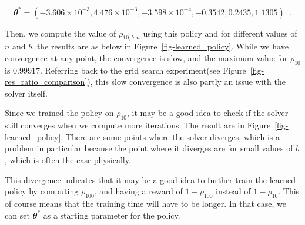 \documentclass[
  letterpaper,
]{report}
\theoremstyle{plain}
\theoremstyle{definition}
\theoremstyle{definition}
\theoremstyle{remark}
\begin{document}
\[
\mathbfit{\theta}^* = (-3.606 \times 10^{-3},4.476\times 10^{-3},-3.598\times 10^{-4},-0.3542 ,0.2435,1.1305)^\intercal.
\]

Then, we compute the value of \(\rho_{10,b,n}\) using this policy and
for different values of \(n\) and \(b\), the results are as below in
Figure~\ref{fig-learned_policy}. While we have convergence at any point,
the convergence is slow, and the maximum value for \(\rho_{10}\) is
\(0.99917\). Referring back to the grid search experiment(see
Figure~\ref{fig-res_ratio_comparison}), this slow convergence is also
partly an issue with the solver itself.

Since we trained the policy on \(\rho_{10}\), it may be a good idea to
check if the solver still converges when we compute more iterations. The
result are in Figure~\ref{fig-learned_policy}. There are some points
where the solver diverges, which is a problem in particular because the
point where it diverges are for small values of \(b\), which is often
the case physically.

This divergence indicates that it may be a good idea to further train
the learned policy by computing \(\rho_{100}\), and having a reward of
\(1-\rho_{100}\) instead of \(1-\rho_{10}\). This of course means that
the training time will have to be longer. In that case, we can set
\(\mathbfit{\theta}^*\) as a starting parameter for the policy.
\end{document}
